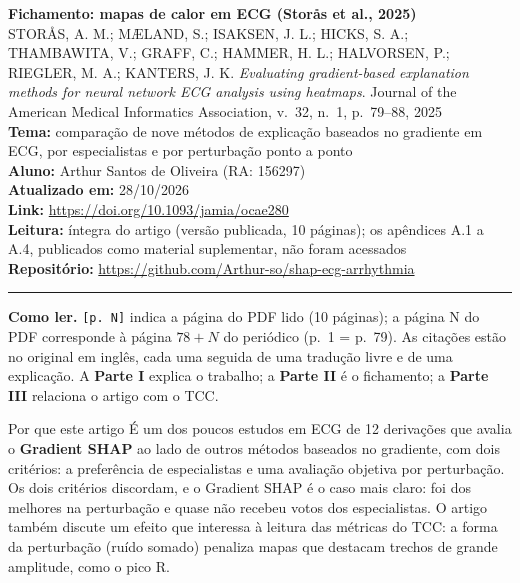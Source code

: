 \documentclass[11pt,a4paper]{article}
\begin{document}
\begin{center}
    {\LARGE \textbf{Fichamento: mapas de calor em ECG (Storås et al., 2025)}} \\[0.35em]
    {\large STORÅS, A. M.; MÆLAND, S.; ISAKSEN, J. L.; HICKS, S. A.; THAMBAWITA, V.; GRAFF, C.; HAMMER, H. L.; HALVORSEN, P.; RIEGLER, M. A.; KANTERS, J. K. \textit{Evaluating gradient-based explanation methods for neural network ECG analysis using heatmaps}. Journal of the American Medical Informatics Association, v.~32, n.~1, p.~79--88, 2025} \\[0.3em]
    \textbf{Tema:} comparação de nove métodos de explicação baseados no gradiente em ECG, por especialistas e por perturbação ponto a ponto \\[0.2em]
    \textbf{Aluno:} Arthur Santos de Oliveira (RA: 156297) \\[0.2em]
    \textbf{Atualizado em:} 28/10/2026 \\[0.2em]
    \textbf{Link:} \url{https://doi.org/10.1093/jamia/ocae280} \\[0.2em]
    \textbf{Leitura:} íntegra do artigo (versão publicada, 10 páginas); os apêndices A.1 a A.4, publicados como material suplementar, não foram acessados \\[0.2em]
    \textbf{Repositório:} \url{https://github.com/Arthur-so/shap-ecg-arrhythmia}
\end{center}
\vspace{-0.5em}
\hrule
\vspace{0.8em}

\textbf{Como ler.} \texttt{[p. N]} indica a página do PDF lido (10 páginas); a página N do PDF corresponde à página $78+N$ do periódico (p.~1 = p.~79). As citações estão no original em inglês, cada uma seguida de uma tradução livre e de uma explicação. A \textbf{Parte I} explica o trabalho; a \textbf{Parte II} é o fichamento; a \textbf{Parte III} relaciona o artigo com o TCC.

\begin{infobox}[note]{Por que este artigo}
É um dos poucos estudos em ECG de 12 derivações que avalia o \textbf{Gradient SHAP} ao lado de outros métodos baseados no gradiente, com dois critérios: a preferência de especialistas e uma avaliação objetiva por perturbação. Os dois critérios discordam, e o Gradient SHAP é o caso mais claro: foi dos melhores na perturbação e quase não recebeu votos dos especialistas. O artigo também discute um efeito que interessa à leitura das métricas do TCC: a forma da perturbação (ruído somado) penaliza mapas que destacam trechos de grande amplitude, como o pico R.
\end{infobox}
\end{document}
